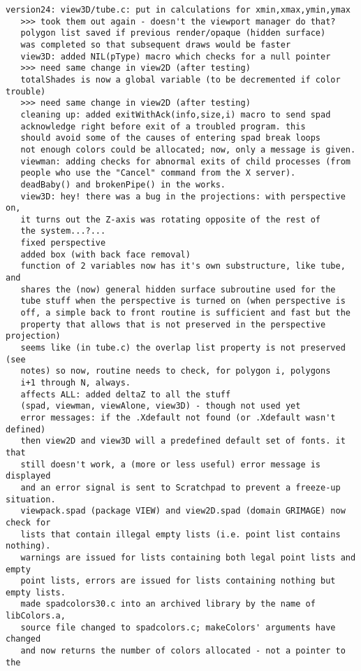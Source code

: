 \documentclass{article}
\begin{document}
\begin{verbatim}
version24: view3D/tube.c: put in calculations for xmin,xmax,ymin,ymax
   >>> took them out again - doesn't the viewport manager do that?
   polygon list saved if previous render/opaque (hidden surface)
   was completed so that subsequent draws would be faster
   view3D: added NIL(pType) macro which checks for a null pointer
   >>> need same change in view2D (after testing)
   totalShades is now a global variable (to be decremented if color trouble)
   >>> need same change in view2D (after testing)
   cleaning up: added exitWithAck(info,size,i) macro to send spad
   acknowledge right before exit of a troubled program. this
   should avoid some of the causes of entering spad break loops
   not enough colors could be allocated; now, only a message is given.
   viewman: adding checks for abnormal exits of child processes (from
   people who use the "Cancel" command from the X server).
   deadBaby() and brokenPipe() in the works.
   view3D: hey! there was a bug in the projections: with perspective on,
   it turns out the Z-axis was rotating opposite of the rest of
   the system...?...
   fixed perspective
   added box (with back face removal)
   function of 2 variables now has it's own substructure, like tube, and
   shares the (now) general hidden surface subroutine used for the
   tube stuff when the perspective is turned on (when perspective is
   off, a simple back to front routine is sufficient and fast but the
   property that allows that is not preserved in the perspective projection)
   seems like (in tube.c) the overlap list property is not preserved (see
   notes) so now, routine needs to check, for polygon i, polygons
   i+1 through N, always.
   affects ALL: added deltaZ to all the stuff
   (spad, viewman, viewAlone, view3D) - though not used yet
   error messages: if the .Xdefault not found (or .Xdefault wasn't defined)
   then view2D and view3D will a predefined default set of fonts. it that
   still doesn't work, a (more or less useful) error message is displayed
   and an error signal is sent to Scratchpad to prevent a freeze-up situation.
   viewpack.spad (package VIEW) and view2D.spad (domain GRIMAGE) now check for
   lists that contain illegal empty lists (i.e. point list contains nothing).
   warnings are issued for lists containing both legal point lists and empty
   point lists, errors are issued for lists containing nothing but empty lists.
   made spadcolors30.c into an archived library by the name of libColors.a,
   source file changed to spadcolors.c; makeColors' arguments have changed
   and now returns the number of colors allocated - not a pointer to the

\end{verbatim}
\end{document}
